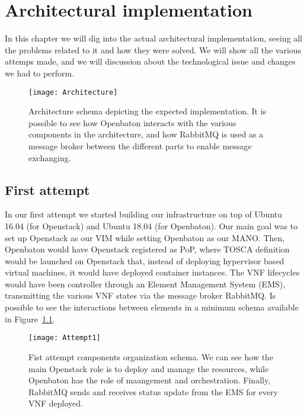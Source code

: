 \chapter{Architectural implementation}
\label{chap:archimpl}
 
In this chapter we will dig into the actual architectural implementation, seeing
all the problems related to it and how they were solved. We will show all the
various attemps made, and we will discussion about the technological issue and
changes we had to perform.

\begin{figure}[t]
  \centering
  \texttt{[image: Architecture]}
  \caption[Architecture schema depicting the expected
    implementation]{Architecture schema depicting the expected implementation.
    It is possible to see how Openbaton interacts with the various components in
    the architecture, and how RabbitMQ is used as a message broker between the
    different parts to enable message exchanging.}
\end{figure}

\section{First attempt}

In our first attempt we started building our infrastructure on top of Ubuntu
16.04 (for Openstack) and Ubuntu 18.04 (for Openbaton). Our main goal was to set
up Openstack as our VIM while setting Openbaton as our MANO. Then, Openbaton
would have Openstack registered as PoP, where TOSCA definition would be launched
on Openstack that, instead of deploying hypervisor based virtual machines, it
would have deployed container instances. The VNF lifecycles would have been
controller through an Element Management System (EMS), transmitting the various
VNF states via the message broker RabbitMQ. Is possible to see the interactions
between elements in a minimum schema available in
Figure~\ref{chap:archimpl:sec:fistattempt:img:schema1}.

\begin{figure}[h]
  \centering
  \texttt{[image: Attempt1]}
  \caption[Fist attempt components organization schema]{Fist attempt components
    organization schema. We can see how the main Openstack role is to deploy and
    manage the resources, while Openbaton has the role of maangement and
    orchestration. Finally, RabbitMQ sends and receives status update from the
    EMS for every VNF deployed.}
  \label{chap:archimpl:sec:fistattempt:img:schema1}
\end{figure}

